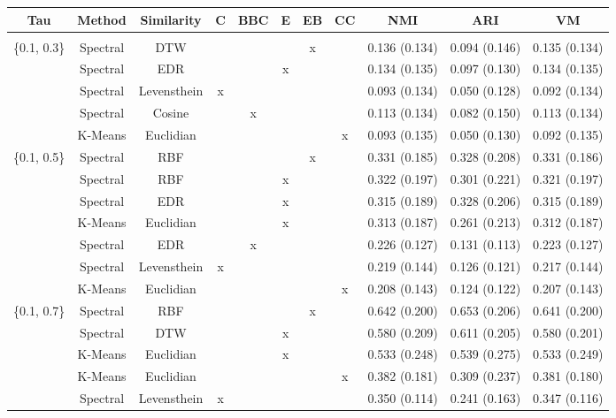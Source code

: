 \documentclass[12pt,a4paper,bibliography=totocnumbered,listof=totocnumbered]{scrartcl}
\begin{document}
\pagebreak

\begin{table}[!htbp] \centering 
	\label{} 
	\scriptsize
	\begin{tabularx}{\textwidth}{ ccccccccccc} 
		\\\toprule
		Tau & Method & Similarity & C & BBC & E & EB & CC & NMI & ARI & VM \\ 
		\hline \\[-1.8ex] 
		\{0.1, 0.3\} & Spectral & DTW &  &  &  & x &  & 0.136 (0.134) & 0.094 (0.146) & 0.135 (0.134) \\ 
		& Spectral & EDR &  &  & x &  &  & 0.134 (0.135) & 0.097 (0.130) & 0.134 (0.135) \\ 
		& Spectral & Levensthein & x &  &  &  &  & 0.093 (0.134) & 0.050 (0.128) & 0.092 (0.134) \\ 
		& Spectral & Cosine &  & x &  &  &  & 0.113 (0.134) & 0.082 (0.150) & 0.113 (0.134) \\ 
		& K-Means & Euclidian &  &  &  &  & x & 0.093 (0.135) & 0.050 (0.130) & 0.092 (0.135) \\ 
		\{0.1, 0.5\} & Spectral & RBF &  &  &  & x &  & 0.331 (0.185) & 0.328 (0.208) & 0.331 (0.186) \\ 
		& Spectral & RBF &  &  & x &  &  & 0.322 (0.197) & 0.301 (0.221) & 0.321 (0.197) \\ 
		& Spectral & EDR &  &  & x &  &  & 0.315 (0.189) & 0.328 (0.206) & 0.315 (0.189) \\ 
		& K-Means & Euclidian &  &  & x &  &  & 0.313 (0.187) & 0.261 (0.213) & 0.312 (0.187) \\ 
		& Spectral & EDR &  & x &  &  &  & 0.226 (0.127) & 0.131 (0.113) & 0.223 (0.127) \\ 
		& Spectral & Levensthein & x &  &  &  &  & 0.219 (0.144) & 0.126 (0.121) & 0.217 (0.144) \\ 
		& K-Means & Euclidian &  &  &  &  & x & 0.208 (0.143) & 0.124 (0.122) & 0.207 (0.143) \\ 
		\{0.1, 0.7\} & Spectral & RBF &  &  &  & x &  & 0.642 (0.200) & 0.653 (0.206) & 0.641 (0.200) \\ 
		& Spectral & DTW &  &  & x &  &  & 0.580 (0.209) & 0.611 (0.205) & 0.580 (0.201) \\ 
		& K-Means & Euclidian &  &  & x &  &  & 0.533 (0.248) & 0.539 (0.275) & 0.533 (0.249) \\ 
		& K-Means & Euclidian &  &  &  &  & x & 0.382 (0.181) & 0.309 (0.237) & 0.381 (0.180) \\ 
		& Spectral & Levensthein & x &  &  &  &  & 0.350 (0.114) & 0.241 (0.163) & 0.347 (0.116) \\ 

\end{tabularx}
\end{table}
\end{document}
